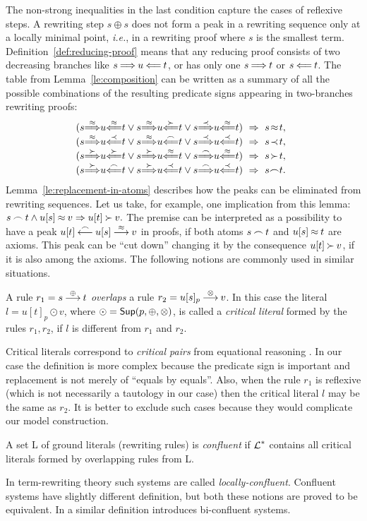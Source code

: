 The non-strong inequalities in the last condition capture the cases of
reflexive steps. A rewriting step \(s\oplus s\) does not form a peak
in a rewriting sequence only at a locally minimal point,
{\em i.e.}, in a rewriting proof where $s$ is the smallest term.
Definition~\ref {def:reducing-proof} means that any reducing proof consists of 
two decreasing branches like \(s\mathbin {\stackrel {}{\Longrightarrow}}u\mathbin {\stackrel {}{\Longleftarrow}}t\), or has only one \(s\mathbin {\stackrel {}{\Longrightarrow}}t\) 
or \(s\mathbin {\stackrel {}{\Longleftarrow}}t\). The table from Lemma~\ref{le:composition} can be written as a 
summary of all the possible combinations of the resulting predicate signs 
appearing in two-branches rewriting proofs:
\[\begin{array}%
 {@{(s}c@{u}c@{t\lor s}c@{u}c@{t\lor s}c@{u}c@{t)\ \impl\ s}c@{t}c}
\TTo\Eq   & \oTT\Eq   & \TTo\Eq   & \oTT\Cont & \TTo\Incl & \oTT\Eq   & \Eq   &,\\
\TTo\Eq   & \oTT\Incl & \TTo\Eq   & \oTT\Int  & \TTo\Incl & \oTT\Incl & \Incl &,\\
\TTo\Cont & \oTT\Cont & \TTo\Cont & \oTT\Eq   & \TTo\Int  & \oTT\Eq   & \Cont &,\\
\TTo\Cont & \oTT\Int  & \TTo\Cont & \oTT\Incl & \TTo\Int  & \oTT\Incl & \Int  &.
\end{array}\]
Lemma~\ref{le:replacement-in-atoms} describes how the peaks can be eliminated
from rewriting sequences. Let us take, for example, one implication from this lemma:
\(s\mathbin{\frown} t\land u[s]\mathbin{\approx} v\mathrel\Rightarrow u[t]\mathbin{\succ} v.\)
The premise can be interpreted as a possibility to have a peak \(u[t] \mathbin {\stackrel {\mathbin{\frown}}{\longleftarrow}}
u[s] \mathbin {\stackrel {\mathbin{\approx}}{\longrightarrow}} v \) in proofs, if both atoms \(s\mathbin{\frown} t\) and \(u[s]\mathbin{\approx} t\) are
axioms. This peak can be ``cut down'' changing it by the consequence
\(u[t]\mathbin{\succ} v\), if it is also among the axioms. The following notions are
commonly used in similar situations. 
%
\begin{DEFINITION} \label {def:critical-atom}
A rule \(r_1 = s\mathbin {\stackrel {\oplus}{\longrightarrow}} t\) {\em overlaps} a rule \(r_2 = u[s]_p \mathbin {\stackrel {\otimes}{\longrightarrow}} 
v\). In this case the literal \(l = u[t]_p \odot v\), where \(\odot = 
\mbox {\sf Sup}(p,\oplus,\otimes)\), is called a {\em critical literal} formed by 
the rules \(r_1,r_2\), if $l$ is different from \(r_1\) and \(r_2\).
\end{DEFINITION}
Critical literals correspond to {\em critical pairs} from equational reasoning 
\cite{Der}. In our case the definition is more complex because the predicate 
sign is important and replacement is not merely of ``equals by equals''. Also, 
when the rule \(r_1\) is
reflexive (which is not necessarily a tautology in our case) then
the critical literal $l$ may be the same as \(r_2\). It is better to exclude
such cases because they would complicate our model construction.
\begin{DEFINITION} \label{def:confluent-system}
A set \C L of ground literals (rewriting rules) is {\em confluent} if $\mbox {$\cal L$}^\ast$ 
contains all critical literals formed by overlapping rules from \C L.
\end{DEFINITION}
In term-rewriting theory \cite{Der} such systems are called {\em 
locally-confluent}. Confluent systems have slightly different definition, but 
both these notions are proved to be equivalent.  In \cite{LA} a similar 
definition introduces bi-confluent systems.


